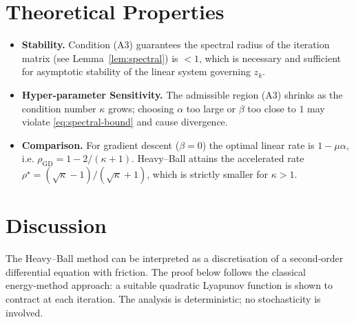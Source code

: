 \documentclass{article}
\begin{document}
\section*{Theoretical Properties}
\begin{itemize}[leftmargin=*]
\item \textbf{Stability.} Condition (A3) guarantees the spectral radius of the iteration matrix (see Lemma~\ref{lem:spectral}) is $<1$, which is necessary and sufficient for asymptotic stability of the linear system governing $z_{k}$.
\item \textbf{Hyper‑parameter Sensitivity.} The admissible region (A3) shrinks as the condition number $\kappa$ grows; choosing $\alpha$ too large or $\beta$ too close to $1$ may violate \eqref{eq:spectral-bound} and cause divergence.
\item \textbf{Comparison.} For gradient descent ($\beta=0$) the optimal linear rate is $1-\mu\alpha$, i.e. $\rho_{\text{GD}}=1-2/(\kappa+1)$. Heavy–Ball attains the accelerated rate $\rho^{\star}= (\sqrt{\kappa}-1)/(\sqrt{\kappa}+1)$, which is strictly smaller for $\kappa>1$.
\end{itemize}

\section*{Discussion}
The Heavy–Ball method can be interpreted as a discretisation of a second‑order differential equation with friction.  The proof below follows the classical energy‑method approach: a suitable quadratic Lyapunov function is shown to contract at each iteration.  The analysis is deterministic; no stochasticity is involved.

\newpage
\end{document}
